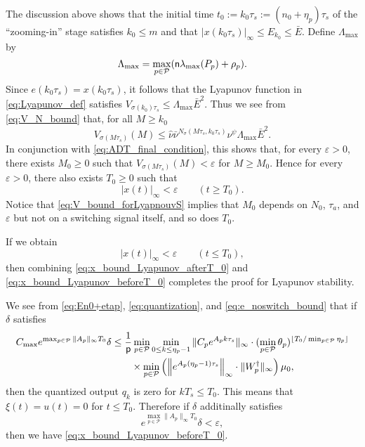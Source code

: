 \documentclass[letterpaper, 11pt, onecolumn]{ieeeconf}  \IEEEoverridecommandlockouts
\begin{document}
The discussion above shows
that the initial time $t_0 := k_0 \tau_s := 
(n_0 + \eta_p)\tau_s$ of the ``zooming-in'' stage
satisfies $k_0 \leq m$ and that
$|x(k_0\tau_s)|_{\infty} \leq E_{k_0} \leq \bar E$.
Define $\Lambda_{\max}$ by
\[
\Lambda_{\max} = \max_{p\in \mathcal{P}} (
{\sf n} \lambda_{\max}(P_p) + \rho_p).
\]
Since $e(k_0\tau_s) = x(k_0\tau_s)$, it follows that
the Lyapunov function in \eqref{eq:Lyapunov_def} satisfies
$
V_{\sigma(k_0)\tau_s} \leq \Lambda_{\max} \bar E^2.
$
Thus we see from \eqref{eq:V_N_bound} that, for all $M \geq k_0$
\begin{equation}
\label{eq:V_bound_forLyapnouvS}
V_{\sigma(M\tau_s )}(M) \leq \hat \nu \bar \nu^{N_{\sigma}(M\tau_s,k_0\tau_s)} 
\nu^{\psi}\Lambda_{\max} \bar E^2.
\end{equation}
In conjunction with \eqref{eq:ADT_final_condition},
this shows that, for every $\varepsilon > 0$, there exists $M_0 \geq 0$ such that
$V_{\sigma(M\tau_s)} (M)< \varepsilon$ for $M \geq M_0$.
Hence for every $\varepsilon > 0$, there also exists $T_0 \geq 0$ such that
\begin{equation}
\label{eq:x_bound_Lyapunov_afterT_0}
|x(t)|_{\infty} < \varepsilon \qquad  (t \geq T_0).
\end{equation}
Notice that \eqref{eq:V_bound_forLyapnouvS} implies that 
$M_0$ depends on $N_0$, $\tau_a$, and $\varepsilon$ 
but not on a switching signal itself, and so does $T_0$.


If we obtain
\begin{equation}
\label{eq:x_bound_Lyapunov_beforeT_0}
|x(t)|_{\infty} < \varepsilon \qquad  (t \leq T_0),
\end{equation}
then
combining \eqref{eq:x_bound_Lyapunov_afterT_0} and
\eqref{eq:x_bound_Lyapunov_beforeT_0}
completes the proof for Lyapunov stability.

We see from
\eqref{eq:En0+etap},
\eqref{eq:quantization}, and \eqref{eq:e_noswitch_bound} that
if $\delta$ satisfies
\begin{align*}
C_{\max} e^{\max_{p \in \mathcal{P}} \|A_p\|_{\infty} T_0} \delta &\leq 
\frac{1}{\sf p}
\min_{p \in \mathcal{P}} \min_{0\leq k \leq \eta_p-1} 
\| C_p e^{A_pk\tau_s}\|_{\infty} \cdot
(\min_{p \in \mathcal{P}} \theta_p)^{\lfloor T_0 / \min_{p \in \mathcal{P}}
\eta_p \rfloor} \\
&\qquad
\times \min_{p \in \mathcal{P}}\left( 
\left\|e^{A_p(\eta_p - 1)\tau_s}\right\|_{\infty} \cdot \|W^{\dagger}_p\|_{\infty}
\right)\mu_0,
\end{align*}
then the quantized output $q_k$ is zero for $kT_s \leq T_0$. 
This means that $\xi(t) = u(t) = 0$ for $t \leq T_0$.
Therefore if $\delta$ additinally satisfies 
\[
e^{\max_{p \in \mathcal{P}} \|A_p\|_{\infty} T_0} \delta 
<\varepsilon,
\]
then we have \eqref{eq:x_bound_Lyapunov_beforeT_0}.
\end{document}
